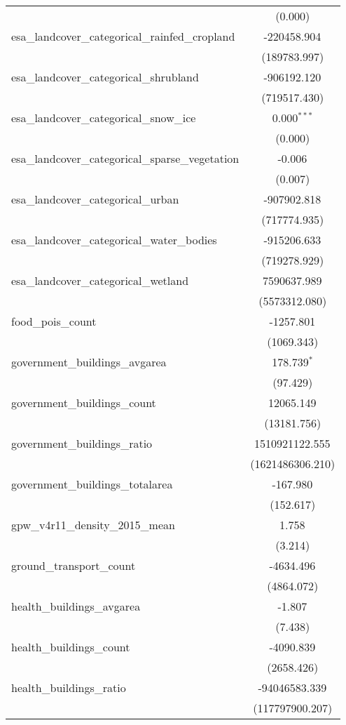 \begin{table}[!htbp]
\begin{tabular}{@{\extracolsep{5pt}}lc}
  & (0.000) \\
 esa_landcover_categorical_rainfed_cropland & -220458.904$^{}$ \\
  & (189783.997) \\
 esa_landcover_categorical_shrubland & -906192.120$^{}$ \\
  & (719517.430) \\
 esa_landcover_categorical_snow_ice & 0.000$^{***}$ \\
  & (0.000) \\
 esa_landcover_categorical_sparse_vegetation & -0.006$^{}$ \\
  & (0.007) \\
 esa_landcover_categorical_urban & -907902.818$^{}$ \\
  & (717774.935) \\
 esa_landcover_categorical_water_bodies & -915206.633$^{}$ \\
  & (719278.929) \\
 esa_landcover_categorical_wetland & 7590637.989$^{}$ \\
  & (5573312.080) \\
 food_pois_count & -1257.801$^{}$ \\
  & (1069.343) \\
 government_buildings_avgarea & 178.739$^{*}$ \\
  & (97.429) \\
 government_buildings_count & 12065.149$^{}$ \\
  & (13181.756) \\
 government_buildings_ratio & 1510921122.555$^{}$ \\
  & (1621486306.210) \\
 government_buildings_totalarea & -167.980$^{}$ \\
  & (152.617) \\
 gpw_v4r11_density_2015_mean & 1.758$^{}$ \\
  & (3.214) \\
 ground_transport_count & -4634.496$^{}$ \\
  & (4864.072) \\
 health_buildings_avgarea & -1.807$^{}$ \\
  & (7.438) \\
 health_buildings_count & -4090.839$^{}$ \\
  & (2658.426) \\
 health_buildings_ratio & -94046583.339$^{}$ \\
  & (117797900.207) \\

\end{tabular}
\end{table}
